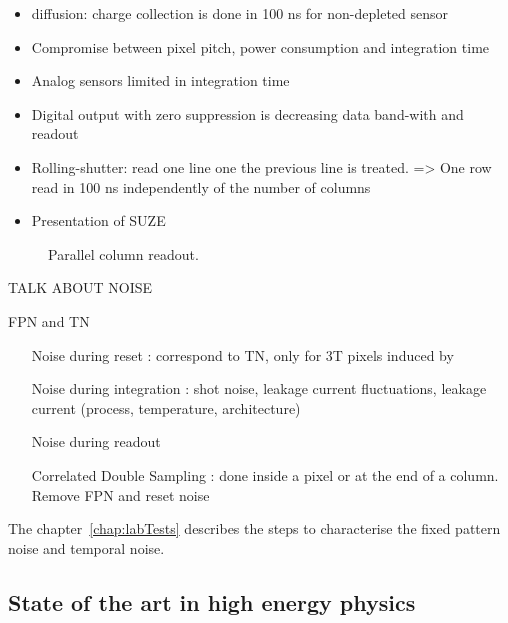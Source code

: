      
    \begin{itemize}
      \item diffusion: charge collection is done in 100 ns for non-depleted sensor
      \item Compromise between pixel pitch, power consumption and integration time
      \item Analog sensors limited in integration time
      \item Digital output with zero suppression is decreasing data band-with and readout
      \item Rolling-shutter: read one line one the previous line is treated. => One row read in 100 ns independently of the number of columns
      \item Presentation of SUZE
      
    \end{itemize}

    \begin{figure}[!h]
      \label{fig:rollShut}
      \caption{Parallel column readout.}
    \end{figure}

    TALK ABOUT NOISE

    \gls{FPN} and \gls{TN}
    \begin{itemize}
      \item[Noise during reset]: correspond to TN, only for 3T pixels induced by 
      \item[Noise during integration]: shot noise, leakage current fluctuations, leakage current (process, temperature, architecture)
      \item[Noise during readout]
      \item[Correlated Double Sampling]: done inside a pixel or at the end of a column. Remove FPN  and reset noise
    \end{itemize}

    The chapter~\ref{chap:labTests} describes the steps to characterise the fixed pattern noise and temporal noise.


    \subsection{State of the art in high energy physics}

